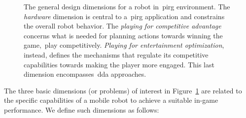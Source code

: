 \begin{figure}[h]
    \caption{The general design dimensions for a robot in~\gls{pirg} environment. The \textit{hardware} dimension is central to a~\gls{pirg} application and constrains the overall robot behavior. The \textit{playing for competitive advantage} concerns what is needed for planning actions towards winning the game,~\ie play competitively. \textit{Playing for entertainment optimization}, instead, defines the mechanisms that regulate its competitive capabilities towards making the player more engaged. This last dimension encompasses~\gls{dda} approaches.}
    \label{graph:PIRG_design_structure}
\end{figure}

The three basic dimensions (or problems) of interest in Figure~\ref{graph:PIRG_design_structure} are related to the specific capabilities of a mobile robot to achieve a suitable in-game performance. We define such dimensions as follows:

